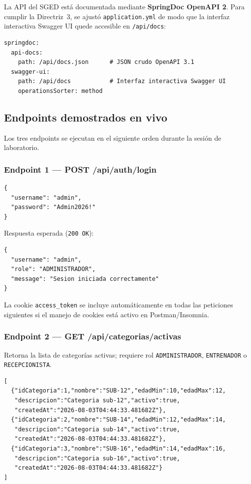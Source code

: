 \documentclass[12pt,a4paper]{article}
\begin{document}
La API del SGED está documentada mediante \textbf{SpringDoc OpenAPI 2}.
Para cumplir la Directriz~3, se ajustó \texttt{application.yml} de modo que la interfaz
interactiva Swagger UI quede accesible en \texttt{/api/docs}:

\begin{lstlisting}[style=yaml, caption={Rutas SpringDoc ajustadas para la demo}]
springdoc:
  api-docs:
    path: /api/docs.json      # JSON crudo OpenAPI 3.1
  swagger-ui:
    path: /api/docs           # Interfaz interactiva Swagger UI
    operationsSorter: method
\end{lstlisting}

\subsection{Endpoints demostrados en vivo}

Los tres endpoints se ejecutan en el siguiente orden durante la sesión de laboratorio.

\subsubsection{Endpoint 1 --- POST /api/auth/login}

\begin{lstlisting}[style=json, caption={Request body --- POST /api/auth/login}]
{
  "username": "admin",
  "password": "Admin2026!"
}
\end{lstlisting}

Respuesta esperada (\texttt{200 OK}):

\begin{lstlisting}[style=json, caption={Response --- POST /api/auth/login}]
{
  "username": "admin",
  "role": "ADMINISTRADOR",
  "message": "Sesion iniciada correctamente"
}
\end{lstlisting}

La cookie \texttt{access\_token} se incluye automáticamente en todas las peticiones
siguientes si el manejo de cookies está activo en Postman/Insomnia.

\subsubsection{Endpoint 2 --- GET /api/categorias/activas}

Retorna la lista de categorías activas; requiere rol \texttt{ADMINISTRADOR},
\texttt{ENTRENADOR} o \texttt{RECEPCIONISTA}.

\begin{lstlisting}[style=json, caption={Response --- GET /api/categorias/activas (captura real, base de datos del SGED)}]
[
  {"idCategoria":1,"nombre":"SUB-12","edadMin":10,"edadMax":12,
   "descripcion":"Categoria sub-12","activo":true,
   "createdAt":"2026-08-03T04:44:33.481682Z"},
  {"idCategoria":2,"nombre":"SUB-14","edadMin":12,"edadMax":14,
   "descripcion":"Categoria sub-14","activo":true,
   "createdAt":"2026-08-03T04:44:33.481682Z"},
  {"idCategoria":3,"nombre":"SUB-16","edadMin":14,"edadMax":16,
   "descripcion":"Categoria sub-16","activo":true,
   "createdAt":"2026-08-03T04:44:33.481682Z"}
]
\end{lstlisting}
\end{document}
